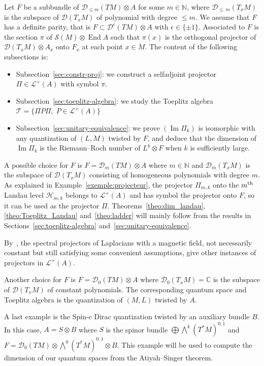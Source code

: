 \documentclass[10pt,a4paper]{article}
\theoremstyle{definition}
\numberwithin{equation}{section}
\newcommand{\N}{{\mathbb{N}}}
\newcommand{\C}{{\mathbb{C}}}
\newcommand{\ep}{\epsilon}
\newcommand{\op}{\operatorname}
\newcommand{\D}{\mathcal{D}}
\newcommand{\symb}{\mathcal{S}}
\newcommand{\lag}{\mathcal{L}}
\newcommand{\Hilb}{\mathcal{H}}
\newcommand{\clT}{\mathcal{T}}
\begin{document}
Let $F$ be a subbundle of $\D_{\leqslant m}(TM)
\otimes A$ for some $m \in \N$, where $\D_{\leqslant\,m} (T_xM)$ is the subspace of $\D(T_xM)$ of polynomial with degree $\leqslant m$. We assume that $F$ has a definite parity, that is $F \subset \D ^\ep (TM) \otimes A$ with $\ep \in \{\pm 1\}$. Associated to $F$ is the section $\pi$ of $\symb (M) \otimes \op{End} A$ such that $\pi(x)$ is the orthogonal projector of $\D(T_xM) \otimes A_x$ onto $F_x$ at each point $x \in M$. The content of the following subsections is:
\begin{itemize}
\item[-] Subsection~\ref{sec:constr-proj}: we construct a selfadjoint projector $\Pi \in \lag ^+(A)$ with symbol $\pi$.
\item[-] Subsection~\ref{sec:toeplitz-algebra}: we study the Toeplitz algebra $ \clT = \{ \Pi P \Pi, \; P \in \lag^{+} (A) \} $
\item[-] Subsection~\ref{sec:unitary-equivalence}: we prove $(
\op{Im} \Pi_k)$ is isomorphic with any quantization of $(L,M)$ twisted by $F$, and deduce that the dimension of $ \op{Im} \Pi_k$ is the Riemann--Roch number of $L^k \otimes F$ when $k$ is sufficiently large.
\end{itemize}

A possible choice for $F$ is $F = \D_m (TM)\otimes A $ where $m\in \N$ and $\D_m (T_xM)$ is the subspace of $\D (T_xM)$ consisting of homogeneous polynomials with degree $m$. As explained in Example~\ref{exemple:projecteur}, the projector $\Pi_{m,k}$ onto the $m^{\rm th}$ Landau level $\Hilb_{m,k}$ belongs to $\lag^+ (A)$ and has symbol the projector onto $F$, so it can be used as the projector $\Pi$. Theorems~\ref{theo:dim_landau}, \ref{theo:Toeplitz_Landau} and~\ref{theo:ladder} will mainly follow from the results in Sections~\ref{sec:toeplitz-algebra} and~\ref{sec:unitary-equivalence}.

By~\cite{oim_copain}, the spectral projectors of Laplacians with a magnetic field, not necessarily constant but still satisfying some convenient assumptions, give other instances of projectors in $\lag ^+(A)$.

Another choice for $F$ is $F = \D_0 (TM) \otimes A$ where $\D_0 (T_xM) =\C$ is the subspace of $\D (T_xM)$ of constant polynomials. The corresponding quantum space and Toeplitz algebra is the quantization of $(M,L)$ twisted by $A$.

A last example is the Spin-c Dirac quantization twisted by an auxiliary bundle $B$. In this case, $A = S \otimes B$ where $S$ is the spinor bundle  $\bigoplus \bigwedge^k (T^*M)^{0,1} $ and $F = \D_0(TM)
\otimes \bigwedge^0 (T^*M)^{0,1} \otimes B$.  This example will be used to compute the dimension of our quantum spaces from the Atiyah--Singer theorem.
\end{document}
